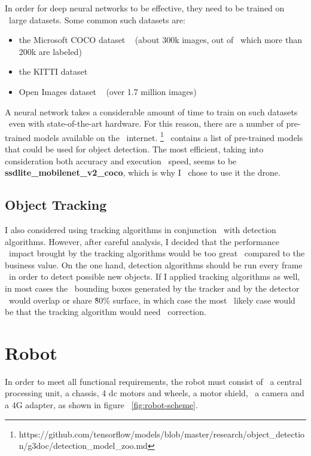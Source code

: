 In order for deep neural networks to be effective, they need to be trained on \
large datasets.
Some common such datasets are:
\begin{itemize}
    \item the Microsoft COCO dataset ~\cite{COCO} (about 300k images, out of \
            which more than 200k are labeled)
    \item the KITTI dataset ~\cite{kitti}
    \item Open Images dataset ~\cite{openimages} (over 1.7 million images)
\end{itemize}

A neural network takes a considerable amount of time to train on such datasets \
even with state-of-the-art hardware.
For this reason, there are a number of pre-trained models available on the \
internet.
\footnote{https://github.com/tensorflow/models/blob/master/research/object\_detection/g3doc/detection\_model\_zoo.md} \
contains a list of pre-trained models that could be used for object detection.
The most efficient, taking into consideration both accuracy and execution \
speed, seems to be \textbf{ssdlite\_mobilenet\_v2\_coco}, which is why I \
chose to use it the drone.

\subsection{Object Tracking}
\label{subsec:analysis-object-tracking}
I also considered using tracking algorithms in conjunction \
with detection algorithms.
However, after careful analysis, I decided that the performance \
impact brought by the tracking algorithms would be too great \
compared to the business value.
On the one hand, detection algorithms should be run every frame \
in order to detect possible new objects.
If I applied tracking algorithms as well, in most cases the \
bounding boxes generated by the tracker and by the detector \
would overlap or share \~80\% surface, in which case the most \
likely case would be that the tracking algorithm would need \
correction.


\section{Robot}
\label{sec:analysis-robot-control}
In order to meet all functional requirements, the robot must consist of \
a central processing unit, a chassis, 4 dc motors and wheels, a motor shield, \
a camera and a 4G adapter, as shown in figure ~\ref{fig:robot-scheme}.

